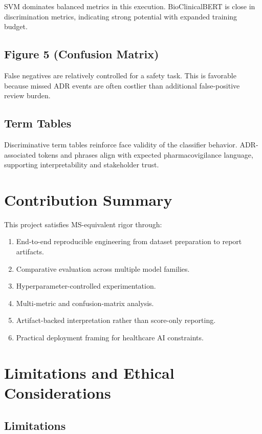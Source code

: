 \documentclass[11pt]{article}
\begin{document}
SVM dominates balanced metrics in this execution. BioClinicalBERT is close in discrimination metrics, indicating strong potential with expanded training budget.


\subsection{Figure 5 (Confusion Matrix)}

False negatives are relatively controlled for a safety task. This is favorable because missed ADR events are often costlier than additional false-positive review burden.


\subsection{Term Tables}

Discriminative term tables reinforce face validity of the classifier behavior. ADR-associated tokens and phrases align with expected pharmacovigilance language, supporting interpretability and stakeholder trust.


\section{Contribution Summary}

This project satisfies MS-equivalent rigor through:


\begin{enumerate}
  \item End-to-end reproducible engineering from dataset preparation to report artifacts.
  \item Comparative evaluation across multiple model families.
  \item Hyperparameter-controlled experimentation.
  \item Multi-metric and confusion-matrix analysis.
  \item Artifact-backed interpretation rather than score-only reporting.
  \item Practical deployment framing for healthcare AI constraints.
\end{enumerate}

\section{Limitations and Ethical Considerations}

\subsection{Limitations}
\end{document}
